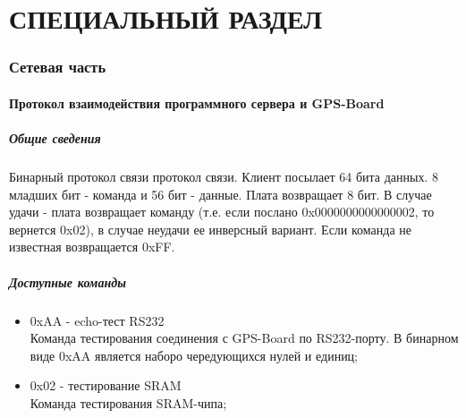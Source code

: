 \part{СПЕЦИАЛЬНЫЙ РАЗДЕЛ}

\section{Сетевая часть}


\subsection{Протокол взаимодействия программного сервера и GPS-Board}
\subsubsection{Общие сведения}
Бинарный протокол связи протокол связи. Клиент посылает 64 бита данных. 8 младших бит - команда и 56 бит - данные. Плата возвращает 8 бит. В случае
удачи - плата возвращает команду (т.е. если послано 0x0000000000000002, то вернется 0x02), в случае неудачи ее инверсный вариант. Если команда не известная
возвращается 0xFF.

\subsubsection{Доступные команды}
\begin{itemize}
\item 0xAA - echo-тест RS232 \\
Команда тестирования соединения с GPS-Board по RS232-порту. В бинарном виде 0xAA является наборо чередующихся нулей и единиц;
\item 0x02 - тестирование SRAM \\ 
Команда тестирования SRAM-чипа;
\end{itemize}

